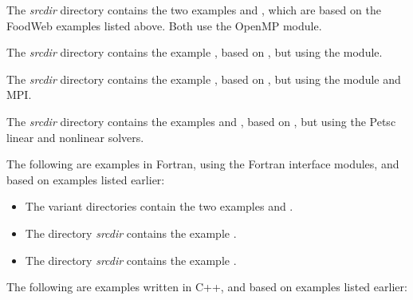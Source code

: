 \vspace{0.2in}\noindent
The {\em srcdir} directory contains the
two examples  and ,
which are based on the FoodWeb examples listed above.  Both use the
OpenMP {\nvector} module.

\vspace{0.2in}\noindent
The {\em srcdir} directory contains the
example , based on ,
but using the  {\nvector} module.

\vspace{0.2in}\noindent
The {\em srcdir} directory contains the
example , based on ,
but using the  {\nvector} module and MPI.


\vspace{0.2in}\noindent
The {\em srcdir} directory contains the
examples  and ,
based on , but using the Petsc linear and
nonlinear solvers.

\vspace{0.2in}\noindent
The following are examples in Fortran, using the {\sundials}
Fortran interface modules, and based on examples listed earlier:

\begin{itemize}

\item The  variant directories contain the two examples
 and
.

\item The directory {\em srcdir}
contains the example .

\item The directory {\em srcdir}
contains the example .

\end{itemize}

\vspace{0.2in}\noindent
The following are examples written in C++, and based on examples
listed earlier:

